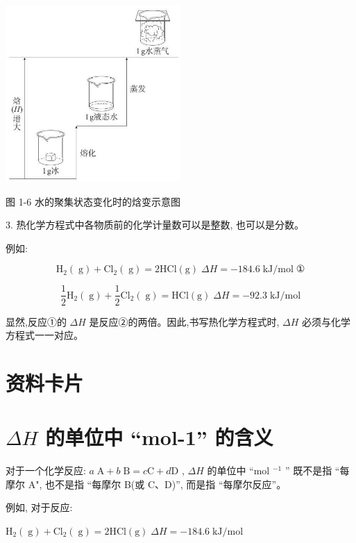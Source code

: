 \documentclass[10pt]{article}
\begin{document}
\begin{center}
\includegraphics[max width=0.5\textwidth]{images/0190da9d-8bfd-732f-bc2c-0b21d0f13b91_14_445460.jpg}
\end{center}

图 1-6 水的聚集状态变化时的焓变示意图

3. 热化学方程式中各物质前的化学计量数可以是整数, 也可以是分数。

例如:

\[
{\mathrm{H}}_{2}\left( \mathrm{\;g}\right) + {\mathrm{{Cl}}}_{2}\left( \mathrm{\;g}\right) = 2\mathrm{{HCl}}\left( \mathrm{g}\right) \;{\Delta H} = - {184.6}\mathrm{\;{kJ}}/\mathrm{{mol}}\;\text{①} \tag{①}
\]

\[
\frac{1}{2}{\mathrm{H}}_{2}\left( \mathrm{\;g}\right) + \frac{1}{2}{\mathrm{{Cl}}}_{2}\left( \mathrm{\;g}\right) = \mathrm{{HCl}}\left( \mathrm{g}\right) \;{\Delta H} = - {92.3}\mathrm{\;{kJ}}/\mathrm{{mol}} \tag{②}
\]

显然,反应①的 \({\Delta H}\) 是反应②的两倍。因此,书写热化学方程式时, \({\Delta H}\) 必须与化学方程式一一对应。

\section*{资料卡片}

\section*{\({\Delta H}\) 的单位中 “mol-1” 的含义}

对于一个化学反应: \(a\mathrm{\;A} + b\mathrm{\;B} = c\mathrm{C} + d\mathrm{D}\) , \({\Delta H}\) 的单位中 “mol \({}^{-1}\) ” 既不是指 “每摩尔 A", 也不是指 “每摩尔 B(或 C、D)”, 而是指 “每摩尔反应”。

例如, 对于反应:

\({\mathrm{H}}_{2}\left( \mathrm{\;g}\right) + {\mathrm{{Cl}}}_{2}\left( \mathrm{\;g}\right) = 2\mathrm{{HCl}}\left( \mathrm{g}\right) \;{\Delta H} = - {184.6}\mathrm{\;{kJ}}/\mathrm{{mol}}\)
\end{document}
